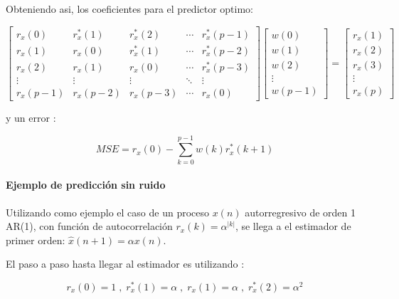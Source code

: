 \documentclass[a4paper]{article}
\begin{document}
Obteniendo asi, los coeficientes para el predictor optimo:



\begin{equation}
	\begin{bmatrix}
		r_x(0) & r_x^*(1) & r_x^*(2) & \cdots & r_x^*(p-1) \\
		r_x(1) & r_x(0) & r_x^*(1) & \cdots & r_x^*(p-2) \\
		r_x(2) & r_x(1) & r_x(0) & \cdots & r_x^*(p-3) \\
		\vdots & \vdots & \vdots & \ddots & \vdots \\
		r_x(p-1) & r_x(p-2) & r_x(p-3) & \cdots & r_x(0)
	\end{bmatrix}
	\begin{bmatrix}
		w(0) \\
		w(1) \\
		w(2) \\
		\vdots \\
		w(p-1)
	\end{bmatrix}
	=
	\begin{bmatrix}
		r_x(1) \\
		r_x(2) \\
		r_x(3) \\
		\vdots \\
		r_x(p)
	\end{bmatrix}
\end{equation}

y un error :

\begin{equation}
	MSE = r_x(0) -
	\sum_{k=0}^{p-1} w(k)r_x^*(k+1)
\end{equation}

\paragraph{Ejemplo de predicción sin ruido}

Utilizando como ejemplo el caso de un proceso $x(n)$ autorregresivo de orden 1 AR(1), con función de autocorrelación $r_x(k) = \alpha ^{|k|}$, se llega a el estimador de primer orden:  $\hat{x}(n+ 1) = \alpha x(n) $.

El paso a paso hasta llegar al estimador es utilizando : 

\begin{equation}
	r_x(0) = 1 \; ,\; r_x^*(1) = \alpha \;,\;	r_x(1) = \alpha \; ,\; r_x^*(2) = \alpha^2 
\end{equation}
\end{document}
